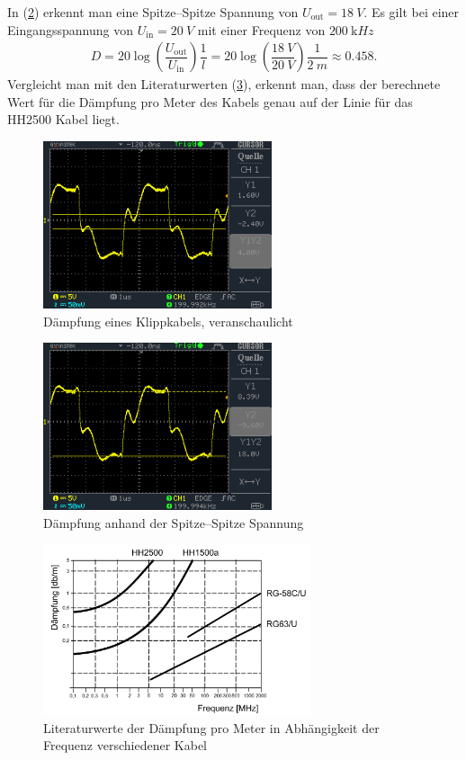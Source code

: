 \documentclass[a4paper,10pt]{article}
\numberwithin{equation}{section}
\begin{document}
In (\ref{fig:dämpfung}) erkennt man eine Spitze--Spitze Spannung von $U_\text{out}=\SI{18}{V}$.
Es gilt bei einer Eingangsspannung von $U_\text{in}=\SI{20}{V}$ mit einer Frequenz von $\SI{200}{\kilo Hz}$
\begin{align} 
        D=20\log\left(\dfrac{U_\text{out}}{U_\text{in}}\right)\dfrac{1}{l}=20\log\left(\dfrac{\SI{18}{V}}{\SI{20}{V}}\right)\dfrac{1}{\SI{2}{m}}\approx 0.458
.\end{align} 
Vergleicht man mit den Literaturwerten (\ref{fig:literatur}), erkennt man, dass der berechnete Wert für die Dämpfung pro Meter des Kabels genau auf der Linie für das HH2500 Kabel liegt.
\begin{figure}[h]
        \centering
        \includegraphics[width=0.6\textwidth]{data/DS0038.BMP.png}
        \caption{Dämpfung eines Klippkabels, veranschaulicht}\label{fig:dämpfung_anschaulich}
\end{figure}
\begin{figure}
        \centering
        \includegraphics[width=0.6\textwidth]{data/DS0039.BMP.png}
        \caption{Dämpfung anhand der Spitze--Spitze Spannung}\label{fig:dämpfung}
\end{figure}
\begin{figure}[h]
        \centering
        \includegraphics[width=0.7\textwidth]{literatur.png}
        \caption[Literatur Dämpfung pro Meter]{Literaturwerte der Dämpfung pro Meter in Abhängigkeit der Frequenz verschiedener Kabel}\label{fig:literatur}
\end{figure}
\end{document}
